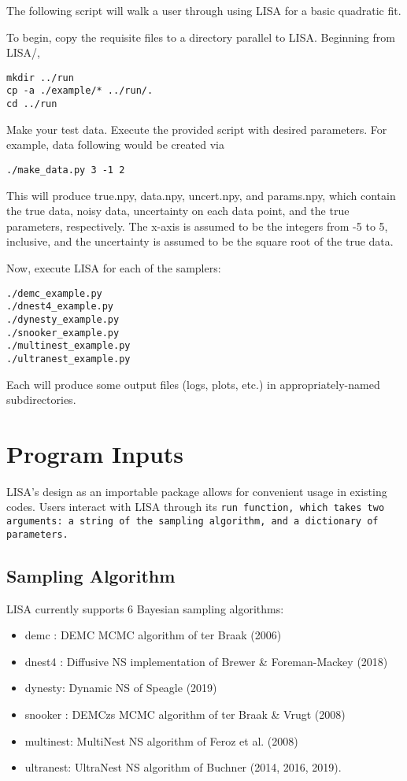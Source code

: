 \documentclass[letterpaper, 12pt]{article}
\begin{document}
The following script will walk a user through using LISA for a basic quadratic 
fit.

\noindent To begin, copy the requisite files to a directory parallel to LISA. 
Beginning from LISA/, 
\begin{verbatim}
mkdir ../run
cp -a ./example/* ../run/.
cd ../run
\end{verbatim}

\noindent Make your test data.  Execute the provided script with 
desired parameters.  For example, data following  
would be created via
\begin{verbatim}
./make_data.py 3 -1 2
\end{verbatim}
\noindent This will produce true.npy, data.npy, uncert.npy, and params.npy, 
which contain the true data, noisy data, uncertainty on each data point, and 
the true parameters, respectively.  The x-axis is assumed to be the integers 
from -5 to 5, inclusive, and the uncertainty is assumed to be the square root 
of the true data.

\noindent Now, execute LISA for each of the samplers:

\begin{verbatim}
./demc_example.py
./dnest4_example.py
./dynesty_example.py
./snooker_example.py
./multinest_example.py
./ultranest_example.py
\end{verbatim}

\noindent Each will produce some output files (logs, plots, etc.) in appropriately-named 
subdirectories.


\section{Program Inputs}
\label{sec:inputs}

LISA's design as an importable package allows for convenient usage in existing 
codes.  Users interact with LISA through its \tt{run} function, which takes two 
arguments: a string of the sampling algorithm, and a dictionary of parameters.

\subsection{Sampling Algorithm}

LISA currently supports 6 Bayesian sampling algorithms:
\begin{itemize}
\item demc   : DEMC MCMC algorithm of ter Braak (2006)
\item dnest4 : Diffusive NS implementation of Brewer & Foreman-Mackey (2018)
\item dynesty: Dynamic NS of Speagle (2019)
\item snooker  : DEMCzs MCMC algorithm of ter Braak \& Vrugt (2008)
\item multinest: MultiNest NS algorithm of Feroz et al. (2008)
\item ultranest: UltraNest NS algorithm of Buchner (2014, 2016, 2019).
\end{itemize}
\end{document}
